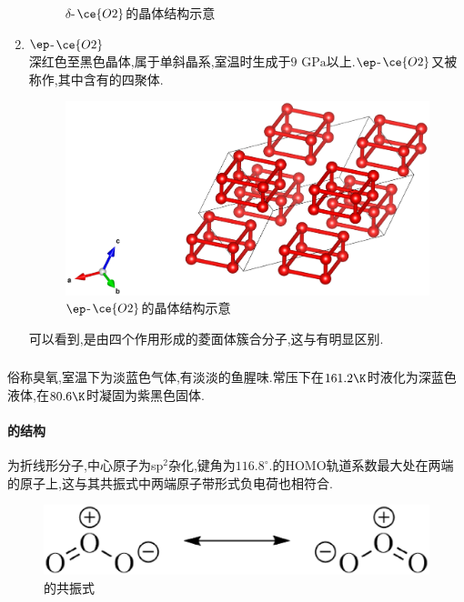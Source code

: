 \documentclass{ctexart}
\begin{document}
\begin{enumerate}[label=\tbf{\arabic*},topsep=0pt,parsep=0pt,itemsep=0pt,partopsep=0pt]
\begin{figure}[H]
            \caption{$\delta$-$\ce{O2}$的晶体结构示意}
        \end{figure}
    \item $\ep$-$\ce{O2}$\\
        \indent 深红色至黑色晶体,属于单斜晶系,室温时生成于$9\text{ GPa}$以上.$\ep$-$\ce{O2}$又被称作,其中含有的四聚体.
        \begin{figure}[H]
            \centering\includegraphics[scale=0.125]{picture/ep-O2.eps}
            \caption{$\ep$-$\ce{O2}$的晶体结构示意}
        \end{figure}
        可以看到,是由四个作用形成的菱面体簇合分子,这与有明显区别.
\end{enumerate}
\subsubsection{}
\begin{substance}[\ce{O3}]
    俗称臭氧,室温下为淡蓝色气体,有淡淡的鱼腥味.常压下在$161.2\K$时液化为深蓝色液体,在$80.6\K$时凝固为紫黑色固体\footnotemark.
\end{substance}
\paragraph{的结构}
为折线形分子,中心原子为sp$^2$杂化,键角为$116.8^\circ$.的HOMO轨道系数最大处在两端的原子上,这与其共振式中两端原子带形式负电荷也相符合.
\begin{figure}[H]
    \centering\includegraphics[scale=0.25]{picture/O3.eps}
    \caption{的共振式}
\end{figure}
\end{document}
